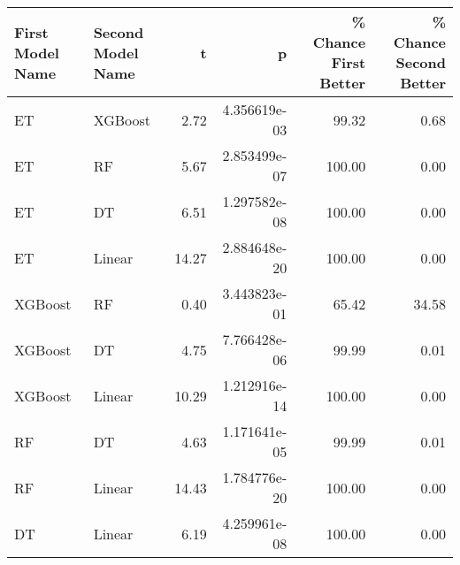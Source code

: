 \begin{tabular}{llrrrr}
\toprule
First Model Name & Second Model Name &     t &            p &  \% Chance First Better &  \% Chance Second Better \\
\midrule
              ET &           XGBoost &  2.72 & 4.356619e-03 &                  99.32 &                    0.68 \\
              ET &                RF &  5.67 & 2.853499e-07 &                 100.00 &                    0.00 \\
              ET &                DT &  6.51 & 1.297582e-08 &                 100.00 &                    0.00 \\
              ET &            Linear & 14.27 & 2.884648e-20 &                 100.00 &                    0.00 \\
         XGBoost &                RF &  0.40 & 3.443823e-01 &                  65.42 &                   34.58 \\
         XGBoost &                DT &  4.75 & 7.766428e-06 &                  99.99 &                    0.01 \\
         XGBoost &            Linear & 10.29 & 1.212916e-14 &                 100.00 &                    0.00 \\
              RF &                DT &  4.63 & 1.171641e-05 &                  99.99 &                    0.01 \\
              RF &            Linear & 14.43 & 1.784776e-20 &                 100.00 &                    0.00 \\
              DT &            Linear &  6.19 & 4.259961e-08 &                 100.00 &                    0.00 \\
\bottomrule
\end{tabular}
